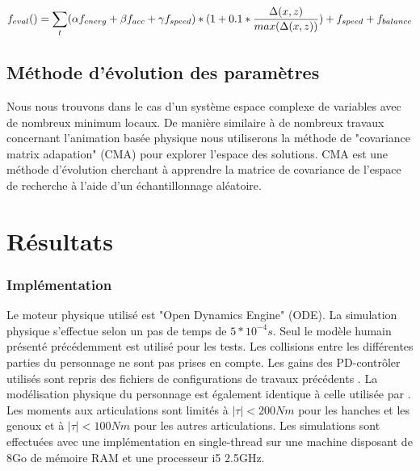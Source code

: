 \documentclass[runningheads,a4paper]{llncs}
\begin{document}
\begin{equation}
f_{eval}() =\sum_{\substack{t}} (\alpha f_{energ} + \beta f_{acc} + \gamma f_{speed})*(1+0.1*\frac{\Delta(x,z)}{max(\Delta(x,z))}) \\
+ f_{speed} + f_{balance}
\label{eq:complete_eval}
\end{equation}



%
\subsection{Méthode d'évolution des paramètres}
Nous nous trouvons dans le cas d'un système espace complexe de variables avec de nombreux minimum locaux. De manière similaire à de nombreux travaux concernant l'animation basée physique \cite{geijtenbeek2012simple,tan2011articulated} nous utiliserons la méthode de "covariance matrix adapation" (CMA) \cite{hansen2006cma} pour explorer l'espace des solutions. CMA est une méthode d'évolution cherchant à apprendre la matrice de covariance de l'espace de recherche à l'aide d'un échantillonnage aléatoire.




%
\section{Résultats}
\label{sec:resultats}
%
\subsubsection{Implémentation}
Le moteur physique utilisé est "Open Dynamics Engine" (ODE). La simulation physique s'effectue selon un pas de temps de $5*10^{-4}s$. Seul le modèle humain présenté précédemment est utilisé pour les tests. Les collisions entre les différentes parties du personnage ne sont pas prises en compte. Les gains des PD-contrôler utilisés sont repris des fichiers de configurations de travaux précédents \cite{coros2009robust}. La modélisation physique du personnage est également identique à celle utilisée par \cite{coros2009robust}. Les moments aux articulations sont limités à $|\tau|<200Nm$ pour les hanches et les genoux et à $|\tau|<100Nm$ pour les autres articulations.
Les simulations sont effectuées avec une implémentation en single-thread sur une machine disposant de 8Go de mémoire RAM et une processeur i5 2.5GHz.
\end{document}
